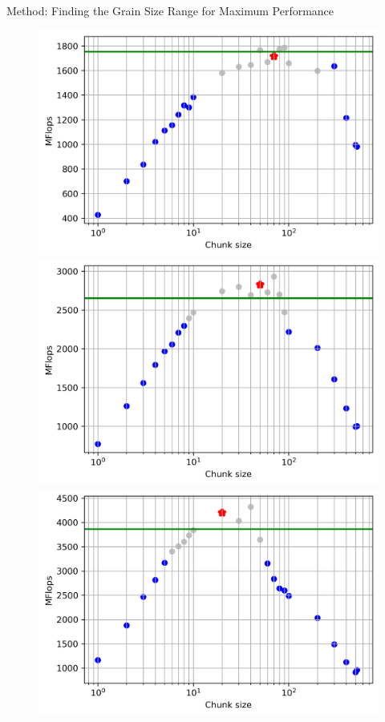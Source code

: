\documentclass[10pt]{beamer}
\begin{document}
\begin{frame}{Method: Finding the Grain Size Range for Maximum Performance}
	\begin{outline}
\begin{figure}[H]
	\centering
	{\includegraphics[scale=.25]{images/polyfit/fig_690_chunks_2_4-256.png}\label{fig14:a}}
	{\includegraphics[scale=.25]{images/polyfit/fig_690_chunks_4_4-256.png}\label{fig14:b}}
	{\includegraphics[scale=.25]{images/polyfit/fig_690_chunks_8_4-256.png}\label{fig14:c}}

\end{figure}
\end{outline}
\end{frame}
\end{document}
